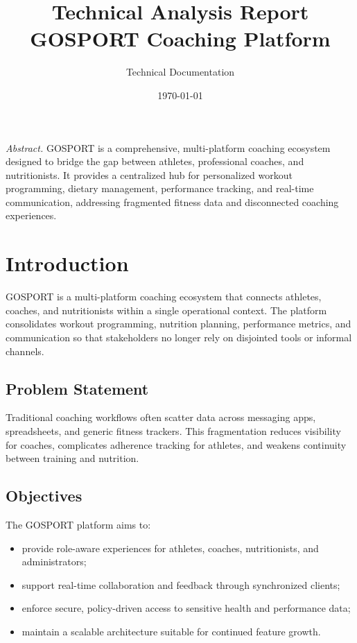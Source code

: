 \documentclass[11pt,a4paper]{report}
\title{%
  {\Large Technical Analysis Report}\\[1.5em]
  {\LARGE\bfseries GOSPORT Coaching Platform}%
}
\author{Technical Documentation}
\date{\today}
\begin{document}
\maketitle
\thispagestyle{empty}
\vfill
\begin{center}
\parbox{0.85\textwidth}{%
\small
\textit{Abstract.} GOSPORT is a comprehensive, multi-platform coaching ecosystem designed to bridge the gap between athletes, professional coaches, and nutritionists. It provides a centralized hub for personalized workout programming, dietary management, performance tracking, and real-time communication, addressing fragmented fitness data and disconnected coaching experiences.}
\end{center}
\vfill
\clearpage

\tableofcontents
\clearpage


\chapter{Introduction}

GOSPORT is a multi-platform coaching ecosystem that connects athletes, coaches, and nutritionists within a single operational context. The platform consolidates workout programming, nutrition planning, performance metrics, and communication so that stakeholders no longer rely on disjointed tools or informal channels.

\section{Problem Statement}
Traditional coaching workflows often scatter data across messaging apps, spreadsheets, and generic fitness trackers. This fragmentation reduces visibility for coaches, complicates adherence tracking for athletes, and weakens continuity between training and nutrition.

\section{Objectives}
The GOSPORT platform aims to:
\begin{itemize}[leftmargin=*]
  \item provide role-aware experiences for athletes, coaches, nutritionists, and administrators;
  \item support real-time collaboration and feedback through synchronized clients;
  \item enforce secure, policy-driven access to sensitive health and performance data;
  \item maintain a scalable architecture suitable for continued feature growth.
\end{itemize}
\end{document}
